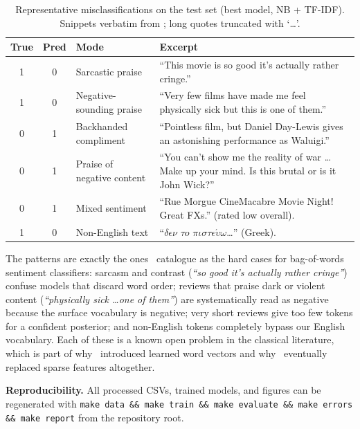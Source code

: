 \documentclass[11pt]{article}
\begin{document}
\begin{table}[ht]
  \centering
  \footnotesize
  \caption{Representative misclassifications on the test set (best model, NB + TF-IDF). Snippets verbatim from \protect{}; long quotes truncated with `\dots'.}
  \label{tab:errors}
  \begin{tabularx}{\linewidth}{@{}cc>{\raggedright\arraybackslash}p{2.6cm}X@{}}
    \toprule
    True & Pred & Mode & Excerpt \\
    \midrule
    1 & 0 & Sarcastic praise & ``This movie is so good it's actually rather cringe.'' \\
    1 & 0 & Negative-sounding praise & ``Very few films have made me feel physically sick but this is one of them.'' \\
    0 & 1 & Backhanded compliment & ``Pointless film, but Daniel Day-Lewis gives an astonishing performance as Waluigi.'' \\
    0 & 1 & Praise of negative content & ``You can't show me the reality of war \dots Make up your mind. Is this brutal or is it John Wick?'' \\
    0 & 1 & Mixed sentiment & ``Rue Morgue CineMacabre Movie Night! Great FXs.'' (rated low overall). \\
    1 & 0 & Non-English text & ``$\delta\epsilon\nu$ $\tau o$ $\pi\iota\sigma\tau\epsilon\acute{\upsilon}\omega$\dots'' (Greek). \\
    \bottomrule
  \end{tabularx}
\end{table}

The patterns are exactly the ones~\citet{pang_lee_2008} catalogue as the hard cases for bag-of-words sentiment classifiers: sarcasm and contrast (\textit{``so good it's actually rather cringe''}) confuse models that discard word order; reviews that praise dark or violent content (\textit{``physically sick \dots one of them''}) are systematically read as negative because the surface vocabulary is negative; very short reviews give too few tokens for a confident posterior; and non-English tokens completely bypass our English vocabulary. Each of these is a known open problem in the classical literature, which is part of why~\citet{maas_imdb_2011} introduced learned word vectors and why~\citet{devlin_bert_2019} eventually replaced sparse features altogether.

\textbf{Reproducibility.} All processed CSVs, trained models, and figures can be regenerated with \texttt{make data \&\& make train \&\& make evaluate \&\& make errors \&\& make report} from the repository root.
\end{document}
